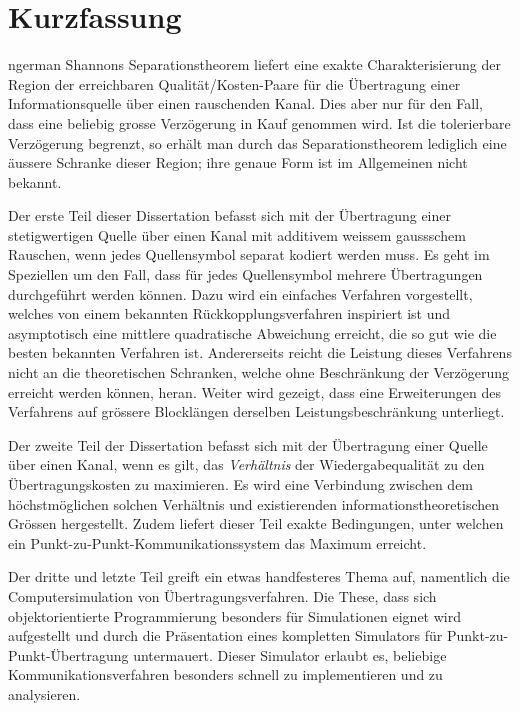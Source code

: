 \chapter*{Kurzfassung}

\begin{hyphenrules}{ngerman}
Shannons Separationstheorem liefert eine exakte Charakterisierung der Region
der erreichbaren Qualität/Kosten-Paare für die Übertragung einer
Informationsquelle über einen rauschenden Kanal. Dies aber nur für den Fall,
dass eine beliebig grosse Verzögerung in Kauf genommen wird. Ist die
tolerierbare Verzögerung begrenzt, so erhält man durch das Separationstheorem
lediglich eine äussere Schranke dieser Region; ihre genaue Form ist im
Allgemeinen nicht bekannt.  

Der erste Teil dieser Dissertation befasst sich mit der Übertragung einer
stetigwertigen Quelle über einen Kanal mit additivem weissem gaussschem
Rauschen, wenn jedes Quellensymbol separat kodiert werden muss. Es geht im
Speziellen um den Fall, dass für jedes Quellensymbol mehrere Übertragungen
durchgeführt werden können. Dazu wird ein einfaches Verfahren vorgestellt,
welches von einem bekannten Rückkopplungsverfahren inspiriert ist und
asymptotisch eine mittlere quadratische Abweichung erreicht, die so gut wie die
besten bekannten Verfahren ist. Andererseits reicht die Leistung dieses
Verfahrens nicht an die theoretischen Schranken, welche ohne Beschränkung der
Verzögerung erreicht werden können, heran. Weiter wird gezeigt, dass eine
Erweiterungen des Verfahrens auf grössere Blocklängen derselben
Leistungsbeschränkung unterliegt.

Der zweite Teil der Dissertation befasst sich mit der Übertragung einer Quelle
über einen Kanal, wenn es gilt, das \emph{Verhältnis} der Wiedergabequalität zu
den Übertragungskosten zu maximieren. Es wird eine Verbindung zwischen dem
höchstmöglichen solchen Verhältnis und existierenden informationstheoretischen
Grössen hergestellt. Zudem liefert dieser Teil exakte Bedingungen, unter welchen
ein Punkt-zu-Punkt-Kommunikationssystem das Maximum erreicht. 

Der dritte und letzte Teil greift ein etwas handfesteres Thema auf, namentlich
die Computersimulation von Übertragungsverfahren. Die These, dass sich
objektorientierte Programmierung besonders für Simulationen eignet wird
aufgestellt und durch die Präsentation eines kompletten Simulators für
Punkt-zu-Punkt-Übertragung untermauert. Dieser Simulator erlaubt es, beliebige
Kommunikationsverfahren besonders schnell zu implementieren und zu analysieren. 
\par
\end{hyphenrules}

